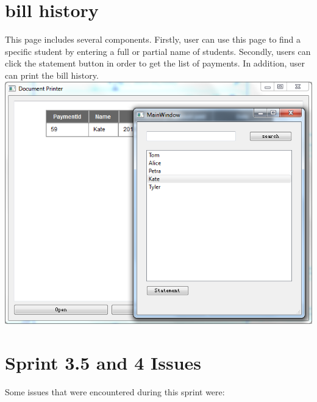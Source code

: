 \documentclass[11pt]{book}
\begin{document}
\section{bill history}
This page includes several components. Firstly, user can use this page to find a specific student by entering a full or partial name of students. Secondly, users can click the statement button in order to get the list of payments. In addition, user can print the bill history.\\

\includegraphics[scale=0.5]{billHistory.png}

\section{Sprint 3.5 and 4 Issues}
Some issues that were encountered during this sprint were:
\end{document}
